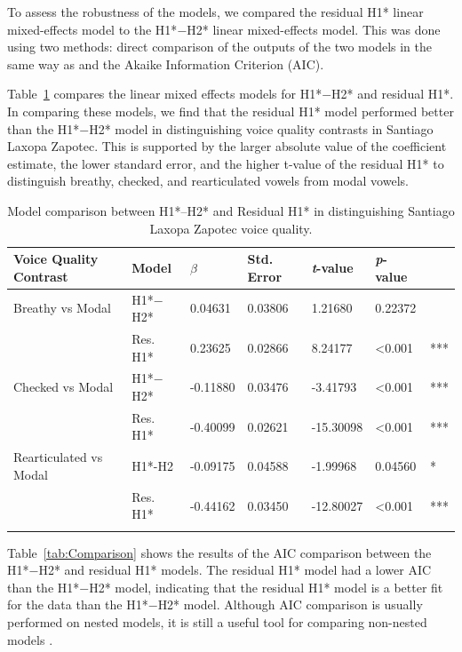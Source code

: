 To assess the robustness of the models, we compared the residual H1* linear mixed-effects model to the H1*$-$H2* linear mixed-effects model. This was done using two methods: direct comparison of the outputs of the two models in the same way as \citet{chaiH1H2AcousticMeasure2022} and the Akaike Information Criterion (AIC). 

Table~\ref{tab:CGComparison} compares the linear mixed effects models for H1*$-$H2* and residual H1*. In comparing these models, we find that the residual H1* model performed better than the H1*$-$H2* model in distinguishing voice quality contrasts in Santiago Laxopa Zapotec. This is supported by the larger absolute value of the coefficient estimate, the lower standard error, and the higher t-value of the residual H1* to distinguish breathy, checked, and rearticulated vowels from modal vowels.

\begin{table}[!h]
  \centering
  \caption{Model comparison between H1*$–$H2* and Residual H1* in distinguishing Santiago Laxopa Zapotec voice quality.}
  \label{tab:CGComparison}
    \begin{tabular}{lllllll}
      \lsptoprule
    Voice Quality Contrast & Model & \textit{$\beta$ } & Std. Error & \textit{t}-value & \textit{p}-value  &     \\
    \hline
      Breathy vs Modal &  H1*$-$H2* & 0.04631 & 0.03806  & 1.21680 & 0.22372 & \\
      & Res. H1* & 0.23625 & 0.02866 & 8.24177   & \textless 0.001   & *** \\
      Checked vs Modal & H1*$-$H2* & -0.11880 & 0.03476 & -3.41793  & \textless 0.001 & *** \\
      & Res. H1* & -0.40099 & 0.02621 & -15.30098 & \textless 0.001 & *** \\
      Rearticulated vs Modal & H1*-H2 & -0.09175 & 0.04588 & -1.99968 & 0.04560 & *  \\
     & Res. H1* & -0.44162 & 0.03450 & -12.80027 & \textless 0.001 & *** \\
     \lspbottomrule
    \end{tabular}
\end{table}

Table~\ref{tab:Comparison} shows the results of the AIC comparison between the H1*$-$H2* and residual H1* models. The residual H1* model had a lower AIC than the H1*$-$H2* model, indicating that the residual H1* model is a better fit for the data than the H1*$-$H2* model. Although AIC comparison is usually performed on nested models, it is still a useful tool for comparing non-nested models \citep{burnhamMultimodelInferenceUnderstanding2004,burnhamAICModelSelection2011,burnhamModelSelectionMultimodel2004}.

